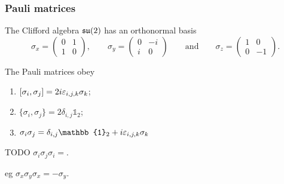 \subsubsection{Pauli matrices}
\begin{proposition}
The Clifford algebra $\operatorname{\mathfrak{su}}(2)$ has an orthonormal basis
\[ \sigma_x = \begin{pmatrix}
0 & 1 \\ 1 & 0
\end{pmatrix}, \qquad \sigma_y = \begin{pmatrix}
0 & -i \\ i & 0
\end{pmatrix} \qquad \text{and}\qquad \sigma_z = \begin{pmatrix}
1 & 0 \\ 0 & -1
\end{pmatrix}. \]
\end{proposition}

\begin{proposition}
The Pauli matrices obey
\begin{enumerate}
\item $[\sigma_i, \sigma_j] = 2i\varepsilon_{i,j,k}\sigma_k$;
\item $\{\sigma_i, \sigma_j\} = 2\delta_{i,j}\mathbb{1}_2$;
\item $\sigma_i\sigma_j = \delta_{i,j}\mathbb{1}_2 + i\leviCivita_{i,j,k}\sigma_{k}$
\end{enumerate}
\end{proposition}

\begin{corollary}
TODO $\sigma_i\sigma_j\sigma_i = $.
\end{corollary}
eg $\sigma_x\sigma_y\sigma_x = -\sigma_y$.

